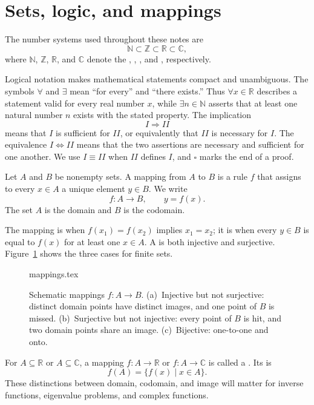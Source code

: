 \section{Sets, logic, and mappings}

The number systems used throughout these notes are
\begin{equation}
\mathbb{N}\subset\mathbb{Z}\subset\mathbb{R}\subset\mathbb{C},
\end{equation}
where $\mathbb{N}$, $\mathbb{Z}$, $\mathbb{R}$, and $\mathbb{C}$ denote the , , , and , respectively.

Logical notation makes mathematical statements compact and unambiguous. The symbols $\forall$ and $\exists$ mean ``for every'' and ``there exists.'' Thus $\forall x\in\mathbb{R}$ describes a statement valid for every real number $x$, while $\exists n\in\mathbb{N}$ asserts that at least one natural number $n$ exists with the stated property. The implication
\begin{equation}
I\Rightarrow II
\end{equation}
means that $I$ is sufficient for $II$, or equivalently that $II$ is necessary for $I$. The equivalence $I\Leftrightarrow II$ means that the two assertions are necessary and sufficient for one another. We use $I\equiv II$ when $II$ defines $I$, and $\square$ marks the end of a proof.

\begin{definition}[Mapping]
Let $A$ and $B$ be nonempty sets. A mapping from $A$ to $B$ is a rule $f$ that assigns to every $x\in A$ a unique element $y\in B$. We write
\begin{equation}
f:A\to B,\qquad y=f(x).
\end{equation}
The set $A$ is the domain and $B$ is the codomain.
\end{definition}

The mapping is  when $f(x_1)=f(x_2)$ implies $x_1=x_2$; it is  when every $y\in B$ is equal to $f(x)$ for at least one $x\in A$. A  is both injective and surjective. Figure~\ref{fig:prelim-mappings} shows the three cases for finite sets.

\begin{figure}[htb]
    \centering
    {mappings.tex}
    \caption{Schematic mappings $f:A\to B$. (a)~Injective but not surjective: distinct domain points have distinct images, and one point of $B$ is missed. (b)~Surjective but not injective: every point of $B$ is hit, and two domain points share an image. (c)~Bijective: one-to-one and onto.}
    \label{fig:prelim-mappings}
\end{figure}

For $A\subseteq\mathbb{R}$ or $A\subseteq\mathbb{C}$, a mapping $f:A\to\mathbb{R}$ or $f:A\to\mathbb{C}$ is called a . Its  is
\begin{equation}
f(A)=\{f(x)\mid x\in A\}.
\end{equation}
These distinctions between domain, codomain, and image will matter for inverse functions, eigenvalue problems, and complex functions.
